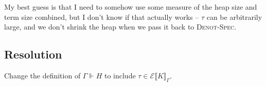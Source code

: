 \documentclass[a4paper, 10pt]{article}
\newcommand{\KEval}[2][\Gamma]{\mathscr{E}\llbracket #2 \rrbracket_{#1}}
\begin{document}
My best guess is that I need to somehow use some measure of the heap size and
term size combined, but I don't know if that actually works -- $\tau$ can be
arbitrarily large, and we don't shrink the heap when we pass it back to
\textsc{Denot-Spec}.

\subsection{Resolution}

Change the definition of $\Gamma \Vdash H$ to include $\tau \in \KEval{K}$.
\end{document}
